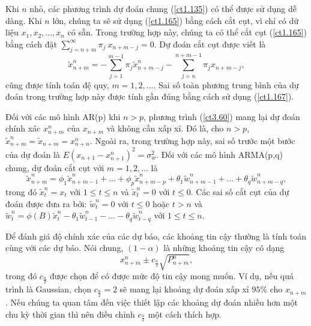 \documentclass[12pt, a4paper,oneside]{book}
\theoremstyle{definition}
\begin{document}
Khi $n$ nhỏ, các phương trình dự đoán chung (\ref{ct1.135}) có thể được sử dụng dễ dàng. Khi $n$ lớn, chúng ta sẽ sử dụng (\ref{ct1.165}) bằng cách cắt cụt, vì chỉ có dữ liệu $x_1, x_2,..., x_n$ có sẵn. Trong trường hợp này, chúng ta có thể cắt cụt (\ref{ct1.165}) bằng cách đặt $\sum_{j=n+m}^{\infty} \pi_{j}\ x_{n+m-j}= 0$. Dự đoán cắt cụt được viết là
\begin{equation}
\tilde{x}^{n}_{n+m}= - \sum_{j=1}^{m-1}\pi_{j}\tilde{x}_{n+m-j}^{n} - \sum_{j=n}^{n+m-1}\pi_{j}x_{n+m-j} , \label{ct1.169}
\end{equation}
cũng được tính toán đệ quy, $m = 1, 2,...$. Sai số toàn phương trung bình của dự đoán trong trường hợp này được tính gần đúng bằng cách sử dụng (\ref{ct1.167}).

Đối với các mô hình AR(p) khi $n> p$, phương trình (\ref{ct3.60}) mang lại dự đoán chính xác $x^{n}_{n+m}$ của $x_{n+m}$ và không cần xấp xỉ. Đó là, cho $n> p$, $\tilde{x}_{n+m}^{n}=\tilde{x}_{n+m}=x^{n}_{n+n}$. Ngoài ra, trong trường hợp này, sai số trước một bước của dự đoán là  $E(x_{n+1} - x_{n+1}^{n})^{2}=\sigma^{2}_{w}$. Đối với các mô hình ARMA(p,q) chung, dự đoán cắt cụt với $m = 1, 2,...$ là
\begin{equation}
\tilde{x}^{n}_{n+m}=\phi_{1}\tilde{x}^{n}_{n+m-1}+...+ \phi_{p}\tilde{x}^{n}_{n+m-p}+ \theta_{1}\tilde{w}^{n}_{n+m-1}+...+\theta_{q}\tilde{w}^{n}_{n+m-q}, \label{ct1.170}
\end{equation}
trong đó $\tilde{x}_{t}^{n}=x_{t}$ với $1\leqslant t \leqslant n$ và $\tilde{x}^{n}_{t}=0$ với $t\leqslant0$. Các sai số cắt cụt của dự đoán được đưa ra bởi: $\tilde{w}_{t}^{n}=0$ với $t\leqslant0$ hoặc $t>n$ và $\tilde{w}_{t}^{n}=\phi(B)\tilde{x}_{t}^{n}-\theta_{1} \tilde{w}_{t-1}^{n}-...-\theta_{q}\tilde{w}_{t-q}^{n}$ với $ 1 \leq t \leq n.$ 

Để đánh giá độ chính xác của các dự báo, các khoảng tin cậy thường là tính toán cùng với các dự báo. Nói chung, $ (1-\alpha) $ là những khoảng tin cậy có dạng 
\begin{equation}
 x_{n+m}^n \pm c_{\frac{a}{2}} \sqrt{P_{n+m}^n}, \label{ct1.171}
\end{equation}
trong đó $c_{\frac{a}{2}} $ được chọn để có được mức độ tin cậy mong muốn. Ví dụ, nếu quá trình là Gaussian, chọn $c_{\frac{a}{2}}=2$ sẽ mang lại khoảng dự đoán xấp xỉ $95\%$ cho $x_{n+m}$. Nếu chúng ta quan tâm đến việc thiết lập các khoảng dự đoán nhiều hơn một chu kỳ thời gian thì nên điều chỉnh $c_{\frac{a}{2}}$ một cách thích hợp.
\end{document}
